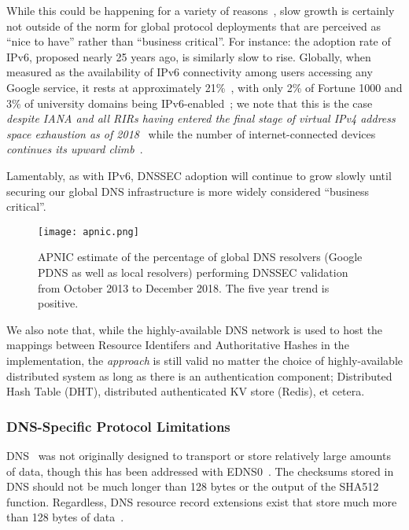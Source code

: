While this could be happening for a variety of reasons~\cite{DNSSEC-is-hard-1,
DNSSEC-is-hard-2, DNSSEC-is-hard-3, DNSSEC-is-hard-4, DNSSEC-is-hard-5}, slow
growth is certainly not outside of the norm for global protocol deployments that
are perceived as ``nice to have'' rather than ``business critical''. For
instance: the adoption rate of IPv6, proposed nearly 25 years ago, is similarly
slow to rise. Globally, when measured as the availability of IPv6 connectivity
among users accessing any Google service, it rests at approximately
21\%~\cite{Google-IPv6}, with only 2\% of Fortune 1000 and 3\% of university
domains being IPv6-enabled~\cite{NIST-IPv6}; we note that this is the case
\emph{despite IANA and all RIRs having entered the final stage of virtual IPv4
address space exhaustion as of 2018}~\cite{APNIC-exhaustion} while the number of
internet-connected devices \emph{continues its upward climb}~\cite{Cisco}.

Lamentably, as with IPv6, DNSSEC adoption will continue to grow slowly until
securing our global DNS infrastructure is more widely considered ``business
critical''.

\begin{figure*}[t]
    \centering
    \texttt{[image: apnic.png]}
    \caption{APNIC estimate of the percentage of global DNS resolvers (Google
    PDNS as well as local resolvers) performing DNSSEC validation from October
    2013 to December 2018. The five year trend is positive.}\label{fig:apnic}
\end{figure*}

We also note that, while the highly-available DNS network is used to host the
mappings between Resource Identifers and Authoritative Hashes in the \SYSTEM{}
implementation, the \SYSTEM{} \emph{approach} is still valid no matter the
choice of highly-available distributed system as long as there is an
authentication component; \eg Distributed Hash Table (DHT), distributed
authenticated KV store (\eg Redis), et cetera.

\subsubsection{DNS-Specific Protocol Limitations}

DNS~\cite{DNS1} was not originally designed to transport or store relatively
large amounts of data, though this has been addressed with EDNS0~\cite{EDNS}.
The checksums stored in DNS should not be much longer than 128 bytes or the
output of the SHA512 function. Regardless, DNS resource record extensions exist
that store much more than 128 bytes of data~\cite{CERT, IPSECKEY, DANE3, DANE1}.


